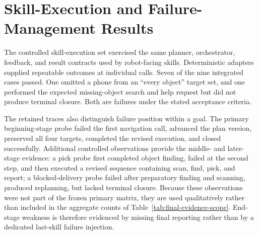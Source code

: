 \section{Skill-Execution and Failure-Management Results}

The controlled skill-execution set exercised the same planner, orchestrator, feedback, and result contracts used by robot-facing skills. Deterministic adapters supplied repeatable outcomes at individual calls. Seven of the nine integrated cases passed. One omitted a phone from an \enquote{every object} target set, and one performed the expected missing-object search and help request but did not produce terminal closure. Both are failures under the stated acceptance criteria.

The retained traces also distinguish failure position within a goal. The primary beginning-stage probe failed the first navigation call, advanced the plan version, preserved all four targets, completed the revised execution, and closed successfully. Additional controlled observations provide the middle- and later-stage evidence: a pick probe first completed object finding, failed  at the second step, and then executed a revised sequence containing scan, find, pick, and report; a blocked-delivery probe failed after preparatory finding and scanning, produced replanning, but lacked terminal closure. Because these observations were not part of the frozen primary matrix, they are used qualitatively rather than included in the aggregate counts of Table~\ref{tab:final-evidence-scope}. End-stage weakness is therefore evidenced by missing final reporting rather than by a dedicated last-skill failure injection.

